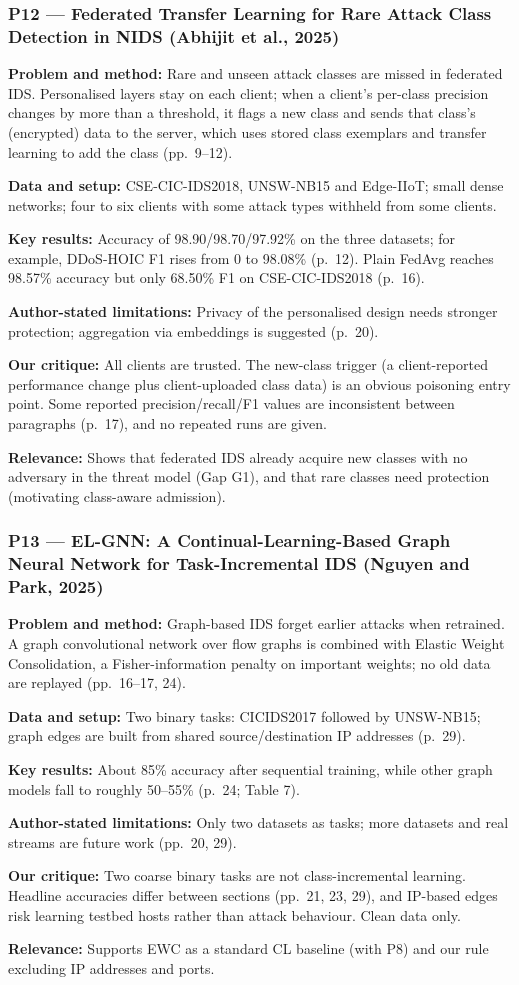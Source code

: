 \documentclass[10pt,a4paper]{article}
\newcommand{\sumitem}[2]{\noindent\textbf{#1:} #2\par}
\begin{document}
\subsubsection*{P12 --- Federated Transfer Learning for Rare Attack Class Detection in NIDS (Abhijit et al., 2025)}
\sumitem{Problem and method}{Rare and unseen attack classes are missed in federated IDS. Personalised layers stay on each client; when a client's per-class precision changes by more than a threshold, it flags a new class and sends that class's (encrypted) data to the server, which uses stored class exemplars and transfer learning to add the class (pp.~9--12).}
\sumitem{Data and setup}{CSE-CIC-IDS2018, UNSW-NB15 and Edge-IIoT; small dense networks; four to six clients with some attack types withheld from some clients.}
\sumitem{Key results}{Accuracy of 98.90/98.70/97.92\% on the three datasets; for example, DDoS-HOIC F1 rises from 0 to 98.08\% (p.~12). Plain FedAvg reaches 98.57\% accuracy but only 68.50\% F1 on CSE-CIC-IDS2018 (p.~16).}
\sumitem{Author-stated limitations}{Privacy of the personalised design needs stronger protection; aggregation via embeddings is suggested (p.~20).}
\sumitem{Our critique}{All clients are trusted. The new-class trigger (a client-reported performance change plus client-uploaded class data) is an obvious poisoning entry point. Some reported precision/recall/F1 values are inconsistent between paragraphs (p.~17), and no repeated runs are given.}
\sumitem{Relevance}{Shows that federated IDS already acquire new classes with no adversary in the threat model (Gap G1), and that rare classes need protection (motivating class-aware admission).}

\subsubsection*{P13 --- EL-GNN: A Continual-Learning-Based Graph Neural Network for Task-Incremental IDS (Nguyen and Park, 2025)}
\sumitem{Problem and method}{Graph-based IDS forget earlier attacks when retrained. A graph convolutional network over flow graphs is combined with Elastic Weight Consolidation, a Fisher-information penalty on important weights; no old data are replayed (pp.~16--17, 24).}
\sumitem{Data and setup}{Two binary tasks: CICIDS2017 followed by UNSW-NB15; graph edges are built from shared source/destination IP addresses (p.~29).}
\sumitem{Key results}{About 85\% accuracy after sequential training, while other graph models fall to roughly 50--55\% (p.~24; Table 7).}
\sumitem{Author-stated limitations}{Only two datasets as tasks; more datasets and real streams are future work (pp.~20, 29).}
\sumitem{Our critique}{Two coarse binary tasks are not class-incremental learning. Headline accuracies differ between sections (pp.~21, 23, 29), and IP-based edges risk learning testbed hosts rather than attack behaviour. Clean data only.}
\sumitem{Relevance}{Supports EWC as a standard CL baseline (with P8) and our rule excluding IP addresses and ports.}
\end{document}

